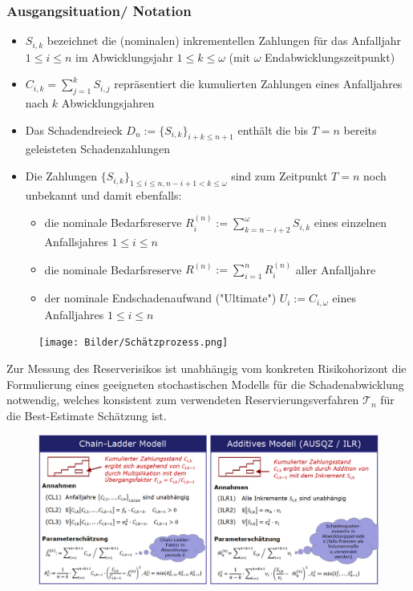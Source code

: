 \documentclass[12pt]{report}
\theoremstyle{dotless}
\theoremstyle{definition}
\begin{document}
\subsubsection{Ausgangsituation/ Notation}
\begin{itemize}
\item $S_{i,k}$ bezeichnet die (nominalen) inkrementellen Zahlungen für das Anfalljahr $1 \leq i \leq n$ im Abwicklungsjahr $1 \leq k \leq \omega$ (mit $\omega$ Endabwicklungszeitpunkt)
\item $C_{i,k} = \sum^k_{j=1} S_{i,j}$ repräsentiert die kumulierten Zahlungen eines Anfalljahres nach $k$ Abwicklungsjahren
\item Das Schadendreieck $D_n:= \{S_{i,k} \}_{i+k\leq n+1}$ enthält die bis $T=n$ bereits geleisteten Schadenzahlungen
\item Die Zahlungen $\{S_{i,k}\} _{1\leq i \leq n, n-i+1 < k \leq \omega}$ sind zum Zeitpunkt $T=n$ noch unbekannt und damit ebenfalls:
\begin{itemize}
\item die nominale Bedarfsreserve $R^{(n)}_i := \sum^\omega_{k=n-i+2}S_{i,k}$ eines einzelnen Anfallsjahres $1\leq i \leq n$
\item die nominale Bedarfsreserve $R^{(n)} := \sum^n_{i=1} R_i^{(n)}$ aller Anfalljahre
\item der nominale Endschadenaufwand ("Ultimate") $U_i:=C_{i,\omega}$ eines Anfalljahres $1\leq i \leq n$
\end{itemize}
\end{itemize}

\begin{figure}[ht]
	\centering
	\texttt{[image: Bilder/Schätzprozess.png]}
\end{figure}

Zur Messung des Reserverisikos ist unabhängig vom konkreten Risikohorizont die Formulierung eines geeigneten stochastischen Modells für die Schadenabwicklung notwendig, welches konsistent zum  verwendeten Reservierungsverfahren $\mathcal{T}_n$ für die Best-Estimate Schätzung ist.

\begin{figure}[ht]
	\centering
	\includegraphics[width= \textwidth]{Bilder/Modelle.png}
\end{figure}
\end{document}
